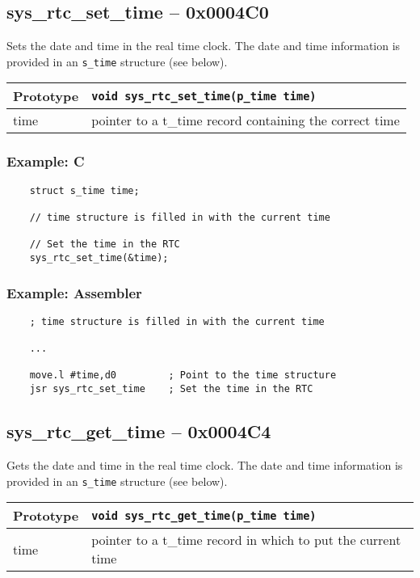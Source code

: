 \subsection*{sys\_rtc\_set\_time -- 0x0004C0}
Sets the date and time in the real time clock. The date and time information is provided in an \verb+s_time+ structure (see below).

\bigskip

\begin{tabular}{|l||l|} \hline
Prototype & \lstinline!void sys_rtc_set_time(p_time time)! \\ \hline
time & pointer to a t\_time record containing the correct time \\ \hline
\end{tabular}

\subsubsection*{Example: C}
\begin{lstlisting}
    struct s_time time;
    
    // time structure is filled in with the current time

    // Set the time in the RTC
    sys_rtc_set_time(&time);
\end{lstlisting}

\subsubsection*{Example: Assembler}
\begin{verbatim}
    ; time structure is filled in with the current time

    ...

    move.l #time,d0         ; Point to the time structure
    jsr sys_rtc_set_time    ; Set the time in the RTC
\end{verbatim}


\subsection*{sys\_rtc\_get\_time -- 0x0004C4}
Gets the date and time in the real time clock. The date and time information is provided in an \verb+s_time+ structure (see below).

\bigskip

\begin{tabular}{|l||l|} \hline
Prototype & \lstinline!void sys_rtc_get_time(p_time time)! \\ \hline
time & pointer to a t\_time record in which to put the current time \\ \hline
\end{tabular}

